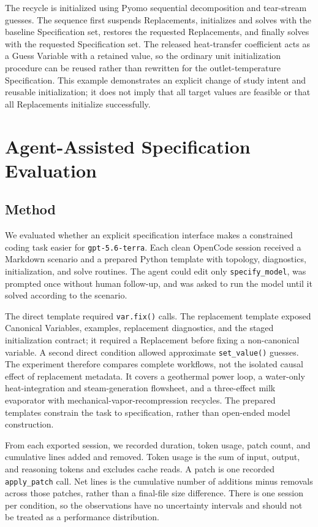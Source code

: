 \documentclass[10pt,letterpaper]{article}
\begin{document}
The recycle is initialized using Pyomo sequential decomposition and tear-stream guesses. The sequence first suspends Replacements, initializes and solves with the baseline Specification set, restores the requested Replacements, and finally solves with the requested Specification set. The released heat-transfer coefficient acts as a Guess Variable with a retained value, so the ordinary unit initialization procedure can be reused rather than rewritten for the outlet-temperature Specification. This example demonstrates an explicit change of study intent and reusable initialization; it does not imply that all target values are feasible or that all Replacements initialize successfully.

\section{Agent-Assisted Specification Evaluation}
\subsection{Method}
We evaluated whether an explicit specification interface makes a constrained coding task easier for \texttt{gpt-5.6-terra}. Each clean OpenCode session received a Markdown scenario and a prepared Python template with topology, diagnostics, initialization, and solve routines. The agent could edit only \texttt{specify\_model}, was prompted once without human follow-up, and was asked to run the model until it solved according to the scenario.

The direct template required \texttt{var.fix()} calls. The replacement template exposed Canonical Variables, examples, replacement diagnostics, and the staged initialization contract; it required a Replacement before fixing a non-canonical variable. A second direct condition allowed approximate \texttt{set\_value()} guesses. The experiment therefore compares complete workflows, not the isolated causal effect of replacement metadata. It covers a geothermal power loop, a water-only heat-integration and steam-generation flowsheet, and a three-effect milk evaporator with mechanical-vapor-recompression recycles. The prepared templates constrain the task to specification, rather than open-ended model construction.

From each exported session, we recorded duration, token usage, patch count, and cumulative lines added and removed. Token usage is the sum of input, output, and reasoning tokens and excludes cache reads. A patch is one recorded \texttt{apply\_patch} call. Net lines is the cumulative number of additions minus removals across those patches, rather than a final-file size difference. There is one session per condition, so the observations have no uncertainty intervals and should not be treated as a performance distribution.
\end{document}
